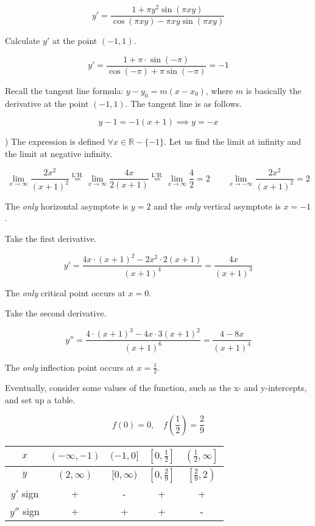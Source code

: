 \documentclass{article}
\begin{document}
\[y'=\frac{1+\pi y^2\sin(\pi xy)}{\cos(\pi xy)-\pi xy\sin(\pi xy)}\]

\noindent Calculate $y'$ at the point $(-1,1)$.

\[y' = \frac{1+\pi\cdot\sin(-\pi)}{\cos(-\pi)+\pi\sin(-\pi)}=-1\]

\hfill

\noindent Recall the tangent line formula: $y-y_0=m(x-x_0)$, where $m$ is basically the derivative at the point $(-1,1)$. The tangent line is as follows.

\[y-1=-1(x+1)\implies\boxed{y=-x}\]

\newpage

) The expression is defined $\forall x\in \mathbb{R}- \{-1\}$. Let us find the limit at infinity and the limit at negative infinity.

\[\lim_{x\to\infty}\frac{2x^2}{(x+1)^2}\overset{\text{L'H.}}{=}\lim_{x\to\infty}\frac{4x}{2(x+1)}\overset{\text{L'H.}}{=}\lim_{x\to\infty}\frac42=2\quad\quad\lim_{x\to-\infty}\frac{2x^2}{(x+1)^2}=2\]

\hfill

\noindent The \textit{only} horizontal asymptote is $y=2$ and the \textit{only} vertical asymptote is $x=-1$.

\hfill 

\noindent Take the first derivative.

\[y'=\frac{4x\cdot(x+1)^2-2x^2\cdot2(x+1)}{(x+1)^4}=\frac{4x}{(x+1)^3}\]

\hfill

\noindent The \textit{only} critical point occurs at $x=0$.

\hfill 

\noindent Take the second derivative.

\[y''=\frac{4\cdot(x+1)^3-4x\cdot3(x+1)^2}{(x+1)^6}=\frac{4-8x}{(x+1)^4}\]

\hfill 

\noindent The \textit{only} inflection point occurs at $\displaystyle x=\frac12$.

\hfill 

\noindent Eventually, consider some values of the function, such as the x- and y-intercepts, and set up a table.

\[f(0) = 0, \quad f\left(\frac12\right)=\frac29\]

\begin{center}
    \large
    \begin{tabular}{ |c| c c c c| } 
    \hline
        $x$ & $(-\infty,-1)$ & $(-1,0]$ & $\left[0,\frac12\right]$ & $\left(\frac12,\infty\right]$ \\
        \hline
        $y$ & $(2,\infty)$ & $[0,\infty)$ & $\left[0,\frac29\right]$ & $\left[\frac29,2\right)$ \\
        \hline
        $y'$ sign & + & - & + & + \\
        \hline
        $y''$ sign & + & + & + & - \\
        \hline
    \end{tabular}
\end{center}
\end{document}
